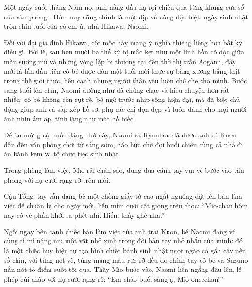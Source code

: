 \documentclass[../main.tex]{subfiles}
\begin{document}
\color{black}


Một ngày cuối tháng Năm nọ, ánh nắng đầu hạ rọi chiếu qua từng khung cửa sổ của văn phòng \hll. Hôm nay cũng chính là một dịp vô cùng đặc biệt: ngày sinh nhật tròn chín tuổi của cô em út nhà Hikawa, Naomi.

Đối với đại gia đình Hikawa, cột mốc này mang ý nghĩa thiêng liêng hơn bất kỳ điều gì. Bởi lẽ, sau hơn mười ba thế kỷ bị mắc kẹt như một linh hồn cô độc giữa màn sương mù và những vòng lặp bi thương tại đền thờ thị trấn Aogami, đây mới là lần đầu tiên cô bé được đón một tuổi mới thực sự bằng xương bằng thịt trong thế giới thực, bên cạnh những người thân yêu luôn chở che cho mình. Bước sang tuổi lên chín, Naomi dường như đã chững chạc và hiểu chuyện hơn rất nhiều: cô bé không còn rụt rè, bỡ ngỡ trước nhịp sống hiện đại, mà đã biết chủ động giúp anh cả sắp xếp hồ sơ, phụ các chị dọn dẹp và luôn dành cho mọi người ánh nhìn ấm áp, tĩnh lặng như mặt hồ biếc.

Để ăn mừng cột mốc đáng nhớ này, Naomi và Ryuuhou đã được anh cả Kuon dẫn đến văn phòng chơi từ sáng sớm, háo hức chờ đợi buổi chiều cùng cả nhà đi ăn bánh kem và tổ chức tiệc sinh nhật.

Trong phòng làm việc, Mio rải chân sáo, đung đưa cánh tay vui vẻ bước vào văn phòng với nụ cười rạng rỡ trên môi.


Cậu Tổng, tay vẫn đang bê một chồng giấy tờ cao ngất ngưởng đặt lên bàn làm việc để chuẩn bị cho ngày mới, liền mỉm cười cất giọng trêu chọc: ``Mio-chan hôm nay có vẻ phấn khởi ra phết nhỉ. Hiếm thấy ghê nha.''

Ngồi ngay bên cạnh chiếc bàn làm việc của anh trai Kuon, bé Naomi đang vô cùng tỉ mỉ nâng niu một vật nhỏ xinh trong đôi bàn tay nhỏ nhắn của mình: đó là một chiếc huy hiệu tự tạo hình chiếc bánh sinh nhật ngọt ngào có gắn cây nến số chín, với từng nét vẽ, từng mảng màu rực rỡ đều do chính tay cô bé và Suzuno nắn nót tô điểm suốt tối qua. Thấy Mio bước vào, Naomi liền ngẩng đầu lên, lễ phép cúi chào với nụ cười rạng rỡ: ``Em chào buổi sáng ạ, Mio-oneechan!''
\end{document}
